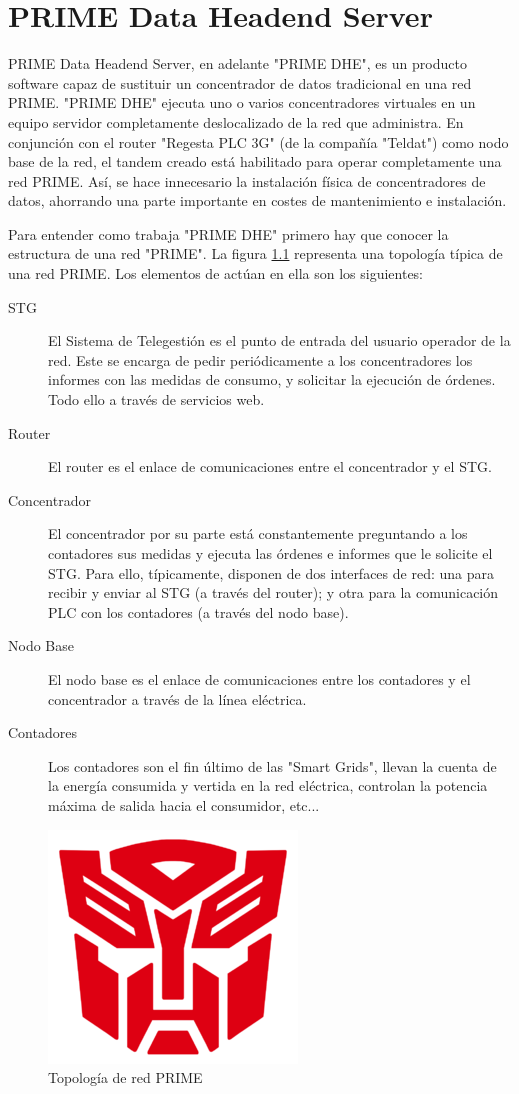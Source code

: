 \chapter{PRIME Data Headend Server}
PRIME Data Headend Server, en adelante "PRIME DHE", es un producto software capaz de sustituir un concentrador de datos tradicional en una red PRIME. "PRIME DHE" ejecuta uno o varios concentradores virtuales en un equipo servidor completamente deslocalizado de la red que administra. En conjunción con el router "Regesta PLC 3G" (de la compañía "Teldat") como nodo base de la red, el tandem creado está habilitado para operar completamente una red PRIME. Así, se hace innecesario la instalación física de concentradores de datos, ahorrando una parte importante en costes de mantenimiento e instalación.

Para entender como trabaja "PRIME DHE"  primero hay que conocer la estructura de una red "PRIME". La figura \ref{fig:EstructuraPRIME} representa una topología típica de una red PRIME. Los elementos de actúan en ella son los siguientes:
\begin{description}
	\item[STG] El Sistema de Telegestión es el punto de entrada del usuario operador de la red. Este se encarga de pedir periódicamente a los concentradores los informes con las medidas de consumo, y solicitar la ejecución de órdenes. Todo ello a través de servicios web.
	\item[Router] El router es el enlace de comunicaciones entre el concentrador y el STG.
	\item[Concentrador] El concentrador por su parte está constantemente preguntando a los contadores sus medidas y ejecuta las órdenes e informes que le solicite el STG. Para ello, típicamente, disponen de dos interfaces de red: una para recibir y enviar al STG (a través del router); y otra para la comunicación PLC con los contadores (a través del nodo base).
	\item[Nodo Base] El nodo base es el enlace de comunicaciones entre los contadores y el concentrador a través de la línea eléctrica.
	\item[Contadores] Los contadores son el fin último de las "Smart Grids", llevan la cuenta de la energía consumida y vertida en la red eléctrica, controlan la potencia máxima de salida hacia el consumidor, etc...
\end{description}

\begin{figure}[htbp]
	\centering
	\includegraphics{Img/dummy.png}
	\caption{Topología de red PRIME}
	\label{fig:EstructuraPRIME}
\end{figure}



